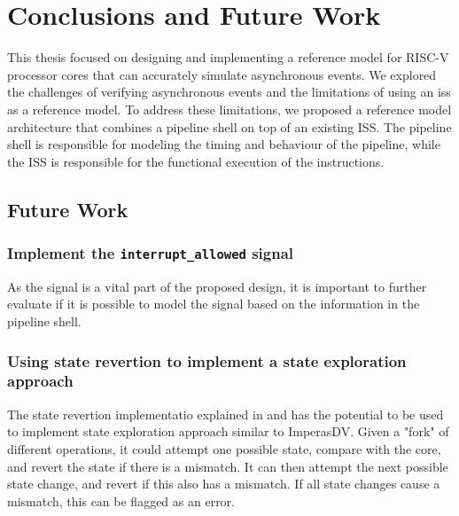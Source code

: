 \chapter{Conclusions and Future Work}
\label{ch:conclusion}



This thesis focused on designing and implementing a reference model for RISC-V processor cores that can accurately simulate asynchronous events. We explored the challenges of verifying asynchronous events and the limitations of using an \acrfull{iss} as a reference model. To address these limitations, we proposed a reference model architecture that combines a pipeline shell on top of an existing ISS. 
The pipeline shell is responsible for modeling the timing and behaviour of the pipeline, while the ISS is responsible for the functional execution of the instructions.




\section{Future Work}

\subsection{Implement the \texttt{interrupt\_allowed} signal}

As the  signal is a vital part of the proposed design, it is important to further evaluate if it is possible to model the signal based on the information in the pipeline shell.


\subsection{Using state revertion to implement a state exploration approach}

The state revertion implementatio explained in  and  has the potential to be used to implement state exploration approach similar to ImperasDV. Given a "fork" of different operations, it could attempt one possible state, compare with the core, and revert the state if there is a mismatch. It can then attempt the next possible state change, and revert if this also has a mismatch. If all state changes cause a mismatch, this can be flagged as an error.


